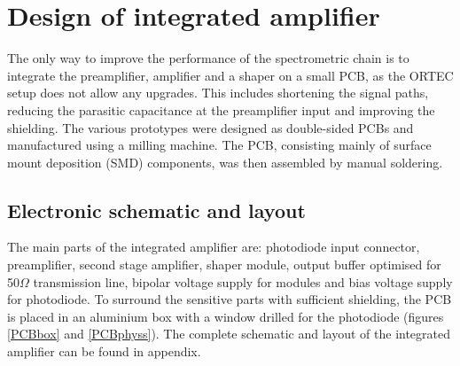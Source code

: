 \chapter{Design of integrated amplifier}
The only way to improve the performance of the spectrometric chain is to integrate the preamplifier, amplifier and a shaper on a small PCB, as the ORTEC setup does not allow any upgrades. This includes shortening the signal paths, reducing the parasitic capacitance at the preamplifier input and improving the shielding. The various prototypes were designed as double-sided PCBs and manufactured using a milling machine. The PCB, consisting mainly of surface mount deposition (SMD) components, was then assembled by manual soldering.

\section{Electronic schematic and layout}
The main parts of the integrated amplifier are: photodiode input connector, preamplifier, second stage amplifier, shaper module, output buffer optimised for 50\nobreakspace$\Omega$ transmission line, bipolar voltage supply for modules and bias voltage supply for photodiode. To surround the sensitive parts with sufficient shielding, the PCB is placed in an aluminium box with a window drilled for the photodiode (figures \ref{PCBbox} and \ref{PCBphyss}). The complete schematic and layout of the integrated amplifier can be found in appendix.



